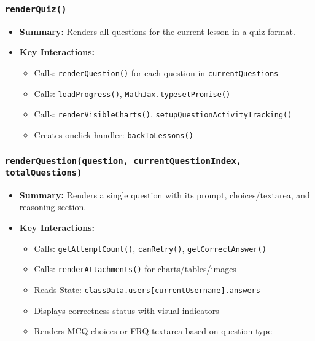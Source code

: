 \documentclass[11pt,letterpaper]{article}
\begin{document}
\subsubsection{\texttt{renderQuiz()}}
\begin{itemize}
    \item \textbf{Summary:} Renders all questions for the current lesson in a quiz format.
    \item \textbf{Key Interactions:}
    \begin{itemize}
        \item Calls: \texttt{renderQuestion()} for each question in \texttt{currentQuestions}
        \item Calls: \texttt{loadProgress()}, \texttt{MathJax.typesetPromise()}
        \item Calls: \texttt{renderVisibleCharts()}, \texttt{setupQuestionActivityTracking()}
        \item Creates onclick handler: \texttt{backToLessons()}
    \end{itemize}
\end{itemize}

\subsubsection{\texttt{renderQuestion(question, currentQuestionIndex, totalQuestions)}}
\begin{itemize}
    \item \textbf{Summary:} Renders a single question with its prompt, choices/textarea, and reasoning section.
    \item \textbf{Key Interactions:}
    \begin{itemize}
        \item Calls: \texttt{getAttemptCount()}, \texttt{canRetry()}, \texttt{getCorrectAnswer()}
        \item Calls: \texttt{renderAttachments()} for charts/tables/images
        \item Reads State: \texttt{classData.users[currentUsername].answers}
        \item Displays correctness status with visual indicators
        \item Renders MCQ choices or FRQ textarea based on question type
    \end{itemize}
\end{itemize}
\end{document}
